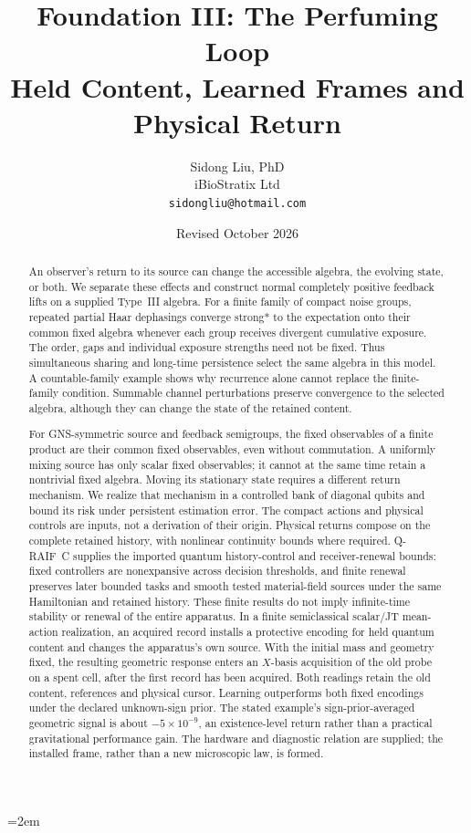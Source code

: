 \documentclass[12pt]{article}
\title{%
  \textbf{Foundation III: The Perfuming Loop}\\
  \textbf{Held Content, Learned Frames and Physical Return}%
}
\author{
  Sidong Liu, PhD \\
  \small iBioStratix Ltd \\
  \small \texttt{sidongliu@hotmail.com}
}
\date{Revised October 2026}
\theoremstyle{definition}
\theoremstyle{remark}
\begin{document}
\emergencystretch=2em
\raggedbottom
{}

\maketitle

\begin{abstract}
An observer's return to its source can change the accessible algebra,
the evolving state, or both. We separate these effects and construct
normal completely positive feedback lifts on a supplied Type~III
algebra. For a finite family of compact noise groups, repeated partial
Haar dephasings converge strong* to the expectation onto their common
fixed algebra whenever each group receives divergent cumulative
exposure. The order, gaps and individual exposure strengths need not be
fixed. Thus simultaneous sharing and long-time persistence select the
same algebra in this model. A countable-family example shows why
recurrence alone cannot replace the finite-family condition. Summable
channel perturbations preserve convergence to the selected algebra,
although they can change the state of the retained content.

For GNS-symmetric source and feedback semigroups, the fixed observables
of a finite product are their common fixed observables, even without
commutation. A uniformly mixing source has only scalar fixed
observables; it cannot at the same time retain a nontrivial fixed
algebra. Moving its stationary state requires a different return
mechanism. We realize that mechanism in a controlled bank of diagonal
qubits and bound its risk under persistent estimation error. The compact
actions and physical controls are inputs, not a derivation of their
origin. Physical returns compose on the complete retained history,
with nonlinear continuity bounds where required. Q-RAIF~C supplies the imported quantum history-control and receiver-renewal
bounds: fixed controllers are nonexpansive across decision thresholds,
and finite renewal preserves later bounded tasks and smooth tested
material-field sources under the same Hamiltonian and retained history. These finite results do not imply
infinite-time stability or renewal of the entire apparatus.
In a finite semiclassical scalar/JT mean-action realization, an acquired record installs a
protective encoding for held quantum content and changes the apparatus's
own source. With the initial mass and geometry fixed, the resulting
geometric response enters an $X$-basis acquisition of the old probe
on a spent cell, after the first record has been acquired.
Both readings retain the old content, references and physical cursor.
Learning outperforms both fixed encodings under the declared unknown-sign
prior. The stated example's sign-prior-averaged geometric signal is about
$-5\times10^{-9}$, an existence-level return rather than a practical
gravitational performance gain. The hardware and diagnostic relation are supplied; the installed
frame, rather than a new microscopic law, is formed.
\end{abstract}
\end{document}
